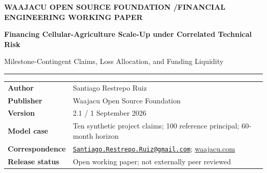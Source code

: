 \documentclass[11pt,a4paper]{article}
\begin{document}
\thispagestyle{empty}
\vspace*{-12mm}
{\small\bfseries\color{Rust}\MakeUppercase{Waajacu Open Source Foundation \enspace/\enspace Financial Engineering Working Paper}}\par
\vspace{7mm}
{\LARGE\bfseries\color{Forest} Financing Cellular-Agriculture Scale-Up under Correlated Technical Risk}\par
\vspace{2mm}
{\large\color{Forest}Milestone-Contingent Claims, Loss Allocation, and Funding Liquidity}\par
\vspace{5mm}
\color{Gold}\rule{\textwidth}{1.2pt}\color{black}
\vspace{4mm}

\begin{tabularx}{\textwidth}{@{}P{0.20\textwidth}Y@{}}
  \textbf{Author} & Santiago Restrepo Ruiz\\
  \textbf{Publisher} & Waajacu Open Source Foundation\\
  \textbf{Version} & 2.1 / 1 September 2026\\
  \textbf{Model case} & Ten synthetic project claims; 100 reference principal; 60-month horizon\\
  \textbf{Correspondence} & \href{mailto:Santiago.Restrepo.Ruiz@gmail.com}{\nolinkurl{Santiago.Restrepo.Ruiz@gmail.com}}; \href{https://waajacu.com}{waajacu.com}\\
  \textbf{Release status} & Open working paper; not externally peer reviewed\\
\end{tabularx}
\end{document}
